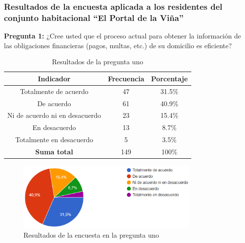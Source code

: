 \subsubsection{Resultados de la encuesta aplicada a los residentes del conjunto habitacional {\textquotedblleft}El Portal de la Viña{\textquotedblright}}
\textbf{Pregunta 1:} ¿Cree usted que el proceso actual para obtener la información de las obligaciones financieras (pagos, multas, etc.) de su domicilio es eficiente?

    \begin{table}[H]
        \centering

        \caption{Resultados de la pregunta uno}
        \begin{footnotesize}
        \begin{tabular}{|c|c|c|}
            \hline
            \textbf{Indicador} & \textbf{Frecuencia} &  \textbf{Porcentaje} \\
            \hline
            Totalmente de acuerdo & 47 & 31.5\% \\
            \hline
            De acuerdo & 61 & 40.9\% \\
            \hline
            Ni de acuerdo ni en desacuerdo & 23 & 15.4\% \\
            \hline
            En desacuerdo & 13 & 8.7\% \\
            \hline
            Totalmente en desacuerdo & 5 & 3.5\% \\
            \hline
            \textbf{Suma total} & 149 & 100\% \\
            \hline
        \end{tabular}\label{tab:table}
        \end{footnotesize}
    \end{table}

    \begin{figure}[H]
              \centering
              \includegraphics[width=0.8\textwidth]{resources/images/p1}
              \caption{Resultados de la encuesta en la pregunta uno}\label{fig:figure_p1}
    \end{figure}


